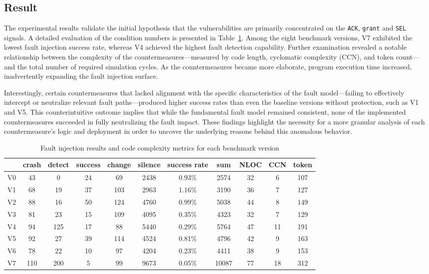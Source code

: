 \subsection{Result}

The experimental results validate the initial hypothesis that the vulnerabilities are primarily concentrated on the \texttt{ACK}, \texttt{grant} and \texttt{SEL} signals. A detailed evaluation of the condition numbers is presented in Table~\ref{tab:benchmark result}. Among the eight benchmark versions, V7 exhibited the lowest fault injection success rate, whereas V4 achieved the highest fault detection capability. Further examination revealed a notable relationship between the complexity of the countermeasures—measured by code length, cyclomatic complexity (CCN), and token count—and the total number of required simulation cycles. As the countermeasures became more elaborate, program execution time increased, inadvertently expanding the fault injection surface.

Interestingly, certain countermeasures that lacked alignment with the specific characteristics of the fault model—failing to effectively intercept or neutralize relevant fault paths—produced higher success rates than even the baseline versions without protection, such as V1 and V5. This counterintuitive outcome implies that while the fundamental fault model remained consistent, none of the implemented countermeasures succeeded in fully neutralizing the fault impact. These findings highlight the necessity for a more granular analysis of each countermeasure’s logic and deployment in order to uncover the underlying reasons behind this anomalous behavior.

\begin{table}
  \centering
  \caption{Fault injection results and code complexity metrics for each benchmark version}
  \label{tab:benchmark result}
\begin{tabular}{ccccccccccc}
\hline
& crash & detect & success & change & silence & success rate & sum & NLOC & CCN & token \\
\hline
V0 & 43 & 0 & 24 & 69 & 2438 & 0.93\% & 2574 & 32 & 6 & 107 \\
V1 & 68 & 19 & 37 & 103 & 2963 & 1.16\% & 3190 & 36 & 7 & 127 \\
V2 & 88 & 16 & 50 & 124 & 4760 & 0.99\% & 5038 & 44 & 8 & 149 \\
V3 & 81 & 23 & 15 & 109 & 4095 & 0.35\% & 4323 & 32 & 7 & 129 \\
V4 & 94 & 125 & 17 & 88 & 5440 & 0.29\% & 5764 & 47 & 11 & 191 \\
V5 & 92 & 27 & 39 & 114 & 4524 & 0.81\% & 4796 & 42 & 9 & 163 \\
V6 & 78 & 22 & 10 & 97 & 4204 & 0.23\%  & 4411 & 38 & 9 & 153 \\
V7 & 110 & 200 & 5 & 99 & 9673 & 0.05\% & 10087 & 77 & 18 & 312\\       
\hline                          
\end{tabular}
\end{table}

